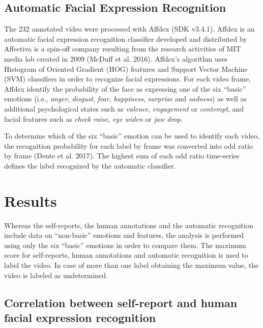 \documentclass[conference,final,]{IEEEtran}
\begin{document}
\hypertarget{automatic-facial-expression-recognition}{%
\subsection{Automatic Facial Expression
Recognition}\label{automatic-facial-expression-recognition}}

The 232 annotated video were processed with Affdex (SDK v3.4.1). Affdex
is an automatic facial expression recognition classifier developed and
distributed by Affectiva is a spin-off company resulting from the
research activities of MIT media lab created in 2009 (McDuff et al.
2016). Affdex's algorithm uses Histogram of Oriented Gradient (HOG)
features and Support Vector Machine (SVM) classifiers in order to
recognize facial expressions. For each video frame, Affdex identify the
probability of the face as expressing one of the six ``basic'' emotions
(i.e., \emph{anger}, \emph{disgust}, \emph{fear}, \emph{happiness},
\emph{surprise} and \emph{sadness}) as well as additional psychological
states such as \emph{valence}, \emph{engagement} or \emph{contempt}, and
facial features such as \emph{cheek raise}, \emph{eye widen} or
\emph{jaw drop}.

To determine which of the six ``basic'' emotion can be used to identify
each video, the recognition probability for each label by frame was
converted into odd ratio by frame (Dente et al. 2017). The highest sum
of each odd ratio time-series defines the label recognized by the
automatic classifier.

\hypertarget{results}{%
\section{Results}\label{results}}

Whereas the self-reports, the human annotations and the automatic
recognition include data on ``non-basic'' emotions and features, the
analysis is performed using only the six ``basic'' emotions in order to
compare them. The maximum score for self-reports, human annotations and
automatic recognition is used to label the video. In case of more than
one label obtaining the maximum value, the video is labeled as
undetermined.

\hypertarget{correlation-between-self-report-and-human-facial-expression-recognition}{%
\subsection{Correlation between self-report and human facial expression
recognition}\label{correlation-between-self-report-and-human-facial-expression-recognition}}
\end{document}
